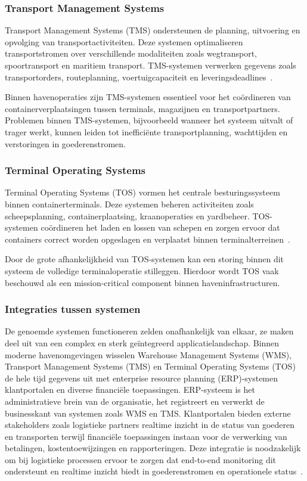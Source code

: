\subsubsection{Transport Management Systems}

Transport Management Systems (TMS) ondersteunen de planning, uitvoering en opvolging van transportactiviteiten. Deze systemen optimaliseren transportstromen over verschillende modaliteiten zoals wegtransport, spoortransport en maritiem transport. TMS-systemen verwerken gegevens zoals transportorders, routeplanning, voertuigcapaciteit en leveringsdeadlines~\autocite{SAPn.d.}.

Binnen havenoperaties zijn TMS-systemen essentieel voor het coördineren van containerverplaatsingen tussen terminals, magazijnen en transportpartners. Problemen binnen TMS-systemen, bijvoorbeeld wanneer het systeem uitvalt of trager werkt, kunnen leiden tot inefficiënte transportplanning, wachttijden en verstoringen in goederenstromen.

\subsubsection{Terminal Operating Systems}

Terminal Operating Systems (TOS) vormen het centrale besturingssysteem binnen containerterminals. Deze systemen beheren activiteiten zoals scheepsplanning, containerplaatsing, kraanoperaties en yardbeheer. TOS-systemen coördineren het laden en lossen van schepen en zorgen ervoor dat containers correct worden opgeslagen en verplaatst binnen terminalterreinen~\autocite{LMA2025}.

Door de grote afhankelijkheid van TOS-systemen kan een storing binnen dit systeem de volledige terminaloperatie stilleggen. Hierdoor wordt TOS vaak beschouwd als een mission-critical component binnen haveninfrastructuren.

\subsubsection{Integraties tussen systemen}

De genoemde systemen functioneren zelden onafhankelijk van elkaar, ze maken deel uit van een complex en sterk geïntegreerd applicatielandschap. Binnen moderne havenomgevingen wisselen Warehouse Management Systems (WMS), Transport Management Systems (TMS) en Terminal Operating Systems (TOS) de hele tijd gegevens uit met enterprise resource planning (ERP)-systemen klantportalen en diverse financiële toepassingen. ERP-systeem is het administratieve brein van de organisatie, het registreert en verwerkt de businesskant van systemen zoals WMS en TMS. Klantportalen bieden externe stakeholders zoals logistieke partners realtime inzicht in de status van goederen en transporten terwijl financiële toepassingen instaan voor de verwerking van betalingen, kostentoewijzingen en rapporteringen. Deze integratie is noodzakelijk om bij logistieke processen ervoor te zorgen dat end-to-end monitoring dit ondersteunt en realtime inzicht biedt in goederenstromen en operationele status~\autocite{Rodrigue2024, EvaluationITSysLogistics2024}.

